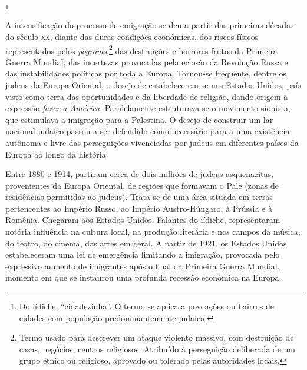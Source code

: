 \footnote{Do iídiche, ``cidadezinha''. O termo se aplica a povoações ou bairros de cidades com população predominantemente judaica.} 

A intensificação do processo de emigração se deu a partir das primeiras décadas do século \textsc{xx}, diante das duras condições econômicas, dos riscos físicos representados pelos
\textit{pogroms},\footnote{Termo usado para descrever um ataque violento massivo, com destruição de casas, negócios, centros religiosos. Atribuído à perseguição deliberada de um grupo étnico ou religioso, aprovado ou tolerado pelas autoridades locais.} das destruições e horrores frutos da Primeira Guerra Mundial,
das incertezas provocadas pela eclosão da Revolução Russa e das
instabilidades políticas por toda a Europa. Tornou-se frequente, dentre os
judeus da Europa Oriental, o desejo de estabelecerem-se nos Estados
Unidos, país visto como terra das oportunidades e da liberdade de
religião, dando origem à expressão \textit{fazer a América}. Paralelamente estruturava-se o movimento sionista, que estimulava a imigração para a Palestina. O desejo de construir um lar nacional judaico passou a ser defendido como necessário para a uma existência autônoma e livre das perseguições vivenciadas por judeus em diferentes países da Europa ao longo da história.

Entre 1880 e 1914, partiram cerca de dois milhões de judeus
asquenazitas, provenientes da Europa Oriental, de regiões que formavam o
Pale (zonas de residências permitidas ao judeus). Trata-se de uma área
situada em terras pertencentes ao Império Russo, ao Império
Austro-Húngaro, à Prússia e à Romênia. Chegaram aos Estados Unidos.
Falantes do iídiche, representaram notória influência na cultura local,
na produção literária e nos campos da música, do teatro, do cinema, das
artes em geral. A partir de 1921, os Estados Unidos estabeleceram uma
lei de emergência limitando a imigração, provocada pelo expressivo
aumento de imigrantes após o final da Primeira Guerra Mundial, momento
em que se instaurou uma profunda recessão econômica na Europa.

